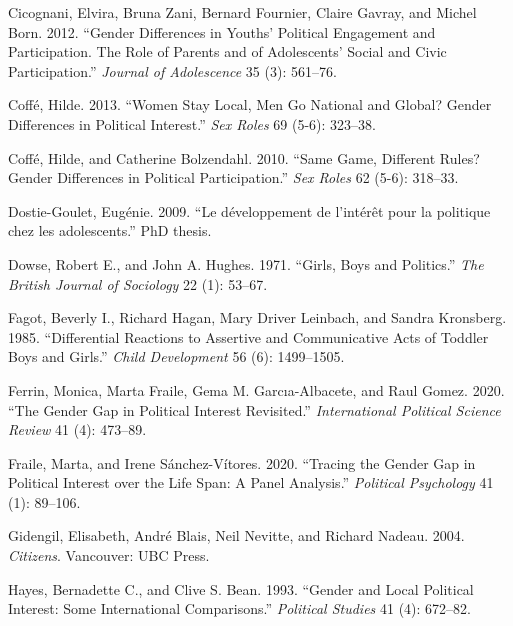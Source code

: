 \documentclass[
  letterpaper,
  DIV=11,
  numbers=noendperiod]{scrreprt}
\newlength{\cslhangindent}
\newlength{\cslentryspacingunit} %
\newenvironment{CSLReferences}[2] %
 {%
  \setlength{\parindent}{0pt}
  \ifodd #1
  \let\oldpar\par
  \def\par{\hangindent=\cslhangindent\oldpar}
  \fi
  \setlength{\parskip}{#2\cslentryspacingunit}
 }%
 {}
\begin{document}
\begin{CSLReferences}{1}{0}
\leavevmode{}%
Cicognani, Elvira, Bruna Zani, Bernard Fournier, Claire Gavray, and
Michel Born. 2012. {``{Gender Differences in Youths' Political
Engagement and Participation. The Role of Parents and of Adolescents'
Social and Civic Participation}.''} \emph{Journal of Adolescence} 35
(3): 561--76.

\leavevmode{}%
Coffé, Hilde. 2013. {``{Women Stay Local, Men Go National and Global?
Gender Differences in Political Interest}.''} \emph{Sex Roles} 69 (5-6):
323--38.

\leavevmode{}%
Coffé, Hilde, and Catherine Bolzendahl. 2010. {``{Same Game, Different
Rules? Gender Differences in Political Participation}.''} \emph{Sex
Roles} 62 (5-6): 318--33.

\leavevmode{}%
Dostie-Goulet, Eugénie. 2009. {``{Le d{é}veloppement de l'int{é}r{ê}t
pour la politique chez les adolescents}.''} PhD thesis.

\leavevmode{}%
Dowse, Robert E., and John A. Hughes. 1971. {``{Girls, Boys and
Politics}.''} \emph{The British Journal of Sociology} 22 (1): 53--67.

\leavevmode{}%
Fagot, Beverly I., Richard Hagan, Mary Driver Leinbach, and Sandra
Kronsberg. 1985. {``{Differential Reactions to Assertive and
Communicative Acts of Toddler Boys and Girls}.''} \emph{Child
Development} 56 (6): 1499--1505.

\leavevmode{}%
Ferrin, Monica, Marta Fraile, Gema M. Garcıa-Albacete, and Raul Gomez.
2020. {``{The Gender Gap in Political Interest Revisited}.''}
\emph{International Political Science Review} 41 (4): 473--89.

\leavevmode{}%
Fraile, Marta, and Irene Sánchez-Vítores. 2020. {``{Tracing the Gender
Gap in Political Interest over the Life Span: A Panel Analysis}.''}
\emph{Political Psychology} 41 (1): 89--106.

\leavevmode{}%
Gidengil, Elisabeth, André Blais, Neil Nevitte, and Richard Nadeau.
2004. \emph{Citizens}. Vancouver: UBC Press.

\leavevmode{}%
Hayes, Bernadette C., and Clive S. Bean. 1993. {``{Gender and Local
Political Interest: Some International Comparisons}.''} \emph{Political
Studies} 41 (4): 672--82.


\end{CSLReferences}
\end{document}
